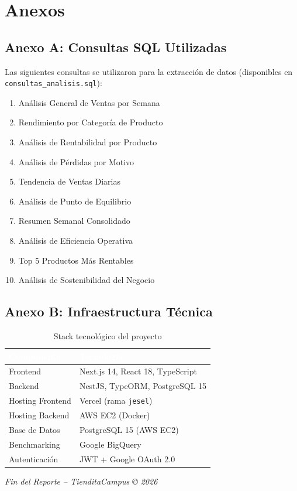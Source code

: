 \documentclass[12pt, a4paper]{article}
\begin{document}
\section{Anexos}

\subsection{Anexo A: Consultas SQL Utilizadas}

Las siguientes consultas se utilizaron para la extracción de datos (disponibles en \texttt{consultas\_analisis.sql}):

\begin{enumerate}
    \item Análisis General de Ventas por Semana
    \item Rendimiento por Categoría de Producto
    \item Análisis de Rentabilidad por Producto
    \item Análisis de Pérdidas por Motivo
    \item Tendencia de Ventas Diarias
    \item Análisis de Punto de Equilibrio
    \item Resumen Semanal Consolidado
    \item Análisis de Eficiencia Operativa
    \item Top 5 Productos Más Rentables
    \item Análisis de Sostenibilidad del Negocio
\end{enumerate}

\subsection{Anexo B: Infraestructura Técnica}

\begin{table}[H]
\centering
\caption{Stack tecnológico del proyecto}
\begin{tabular}{l l}
\toprule
\rowcolor{tableheader}
\textcolor{white}{\textbf{Componente}} & \textcolor{white}{\textbf{Tecnología}} \\
\midrule
Frontend & Next.js 14, React 18, TypeScript \\
\rowcolor{rowalt}
Backend & NestJS, TypeORM, PostgreSQL 15 \\
Hosting Frontend & Vercel (rama \texttt{jesel}) \\
\rowcolor{rowalt}
Hosting Backend & AWS EC2 (Docker) \\
Base de Datos & PostgreSQL 15 (AWS EC2) \\
\rowcolor{rowalt}
Benchmarking & Google BigQuery \\
Autenticación & JWT + Google OAuth 2.0 \\
\bottomrule
\end{tabular}
\end{table}

\vspace{1cm}

\begin{center}

\vspace{0.5cm}
\textit{Fin del Reporte -- TienditaCampus © 2026}
\end{center}
\end{document}
